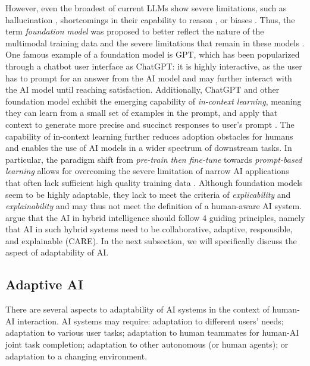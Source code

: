 However, even the broadest of current LLMs show severe limitations, such
as hallucination \citep{jiSurveyHallucinationNatural2023}, shortcomings in their capability to reason 
\citep{bangMultitaskMultilingualMultimodal2023}, or biases \citep{tamkinUnderstandingCapabilitiesLimitations2021}.
Thus, the term \textit{foundation model} was proposed to better reflect the nature of the multimodal training data
and the severe limitations that remain in these models \citep{bommasaniOpportunitiesRisksFoundation2022}. One famous
example of a foundation model is GPT, which has been popularized through a chatbot user interface as ChatGPT: it is
highly interactive, as the user has to prompt for an answer from the AI model and may further interact with the AI
model until reaching satisfaction. Additionally, ChatGPT and other foundation model exhibit the emerging capability
of \textit{in-context learning}, meaning they can learn from a small set of examples in the prompt, and apply that
context to generate more precise and succinct responses to user's prompt \citep{bommasaniOpportunitiesRisksFoundation2022}.
The capability of in-context learning further reduces adoption obstacles for humans and enables the use of AI models
in a wider spectrum of downstream tasks. In particular, the paradigm shift from \textit{pre-train then fine-tune}
towards \textit{prompt-based learning} allows for overcoming the severe limitation of narrow AI applications that
often lack sufficient high quality training data \citep{zhouRevisitingAutomatedPrompting2023}. Although foundation
models seem to be highly adaptable, they lack to meet the criteria of \textit{explicability} and \textit{explainability}
and may thus not meet the definition of a human-aware AI system. \citet{akataResearchAgendaHybrid2020a} argue that
the AI in hybrid intelligence should follow 4 guiding principles, namely that AI in such hybrid systems need 
to be collaborative, adaptive, responsible, and explainable (CARE). In the next subsection, we will specifically 
discuss the aspect of adaptability of AI.


\subsection{Adaptive AI}

There are several aspects to adaptability of AI systems in the context of human-AI interaction. AI systems may
require: adaptation to different users' needs; adaptation to various user tasks; adaptation to human teammates for human-AI
joint task completion; adaptation to other autonomous (or human agents); or adaptation to a changing environment.

